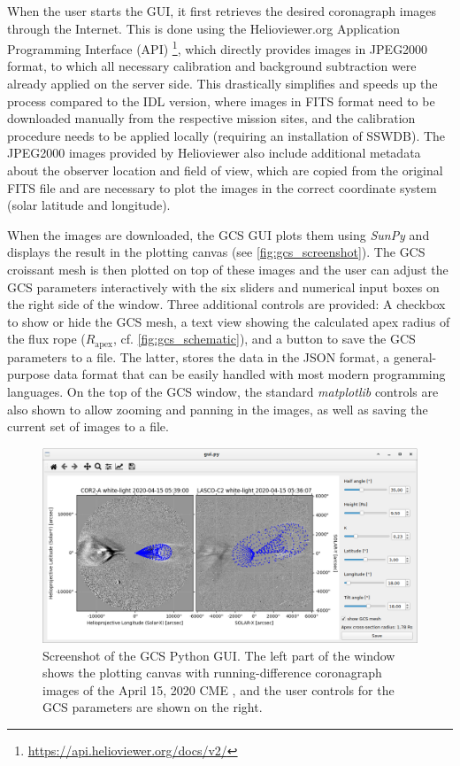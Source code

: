 When the user starts the \ac{GUI}, it first retrieves the desired coronagraph images through the Internet. This is done using the Helioviewer.org Application Programming Interface (API) \footnote{\url{https://api.helioviewer.org/docs/v2/}}, which directly provides images in JPEG2000 format, to which all necessary calibration and background subtraction were already applied on the server side. This drastically simplifies and speeds up the process compared to the \ac{IDL} version, where images in FITS format need to be downloaded manually from the respective mission sites, and the calibration procedure needs to be applied locally (requiring an installation of SSWDB). The JPEG2000 images provided by Helioviewer also include additional metadata about the observer location and field of view, which are copied from the original FITS file and are necessary to plot the images in the correct coordinate system (solar latitude and longitude).

When the images are downloaded, the \ac{GCS} \ac{GUI} plots them using \textit{SunPy} and displays the result in the plotting canvas (see \autoref{fig:gcs_screenshot}). The \ac{GCS} croissant mesh is then plotted on top of these images and the user can adjust the \ac{GCS} parameters interactively with the six sliders and numerical input boxes on the right side of the window. Three additional controls are provided: A checkbox to show or hide the \ac{GCS} mesh, a text view showing the calculated apex radius of the flux rope ($R_\text{apex}$, cf. \autoref{fig:gcs_schematic}), and a button to save the \ac{GCS} parameters to a file. The latter, stores the data in the \ac{JSON} format, a general-purpose data format that can be easily handled with most modern programming languages. On the top of the \ac{GCS} window, the standard \textit{matplotlib} controls are also shown to allow zooming and panning in the images, as well as saving the current set of images to a file.

\begin{figure}
	\centering
	\includegraphics[width=\textwidth]{images/gcs_screenshot.png}
	\caption[Screenshot of the \acs{GCS} Python \acs{GUI}]{Screenshot of the \ac{GCS} Python \ac{GUI}. The left part of the window shows the plotting canvas with running-difference coronagraph images of the April 15, 2020 \ac{CME} \citep[see][]{Forstner-2021-SolO}, and the user controls for the \ac{GCS} parameters are shown on the right.}
	\label{fig:gcs_screenshot}
\end{figure}

